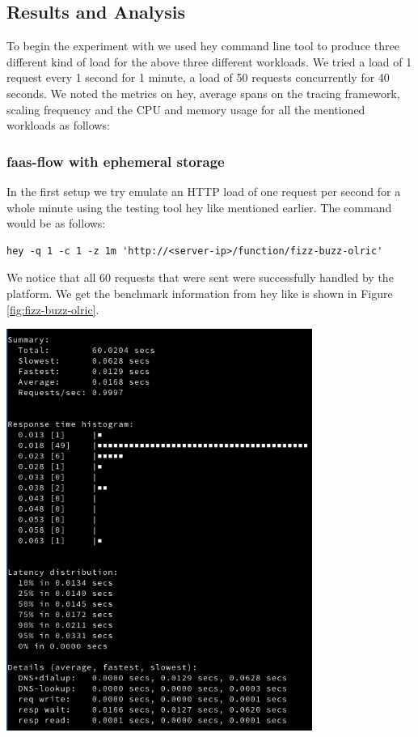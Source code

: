 \documentclass[12pt,titlepage]{article}
\begin{document}
\subsection{Results and Analysis}
\label{sec:orgdd708c0}

To begin the experiment with we used hey command line tool to produce three
different kind of load for the above three different workloads. We tried a load
of 1 request every 1 second for 1 minute, a load of 50 requests concurrently for 40 seconds.
We noted the metrics on hey, average spans on the tracing framework, scaling
frequency and the CPU and memory usage for all the mentioned workloads as
follows:

\subsubsection{faas-flow with ephemeral storage}
\label{sec:org8052481}

In the first setup we try emulate an HTTP load of one request per second for a
whole minute using the testing tool hey like mentioned earlier. The command
would be as follows:
\begin{lstlisting}
hey -q 1 -c 1 -z 1m 'http://<server-ip>/function/fizz-buzz-olric'
\end{lstlisting}
We notice that all 60 requests that were sent were successfully handled by the
platform. We get the benchmark information from hey like is shown in Figure \ref{fig:fizz-buzz-olric}.
\begin{center}
   \begin{minipage}{\linewidth}
     \centering
    \includegraphics[width=100mm]{./thesis_images/real-fizz-1.png}
    \label{fig:fizz-buzz-olric}
\end{minipage}
\end{center}
\end{document}
